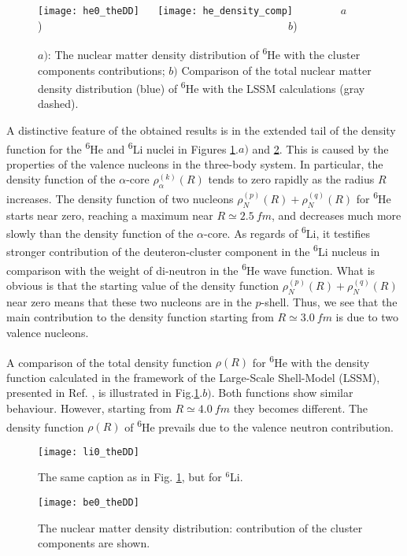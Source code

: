 \documentclass[
12pt, %
oneside, %
english, %
onehalfspacing, %
onehalfspacing, %
headsepline, %
]{MastersDoctoralThesis} %
\newcommand{\he}{\textsuperscript{6}He\xspace}
\newcommand{\li}{\textsuperscript{6}Li\xspace}
\begin{document}
\begin{figure}[bp!]
\centering
\texttt{[image: he0\_theDD]}
~~
\texttt{[image: he\_density\_comp]}
 \flushleft 
{\footnotesize ~~~~~~~~$a$)~~~~~~~~~~~~~~~~~~~~~~~~~~~~~~~~~~~~~~~~~~~~ $b$)}
\centering
\decoRule
\caption{  \footnotesize  $a)$: The nuclear matter density distribution of \he with the cluster components contributions; $b)$ Comparison of the total nuclear matter density distribution (blue) of \he with the LSSM calculations (gray dashed)\cite{antonov2005charge}.}
\label{he0_theDD}
\end{figure}


A distinctive feature of the obtained results is in the extended tail of the density function for the \he and \li nuclei in Figures \ref{he0_theDD}.$a)$ and \ref{li0_theDD}. 
This is caused by the properties of the valence nucleons in the three-body system. 
In particular, the density function of the $\alpha$-core $\rho_\alpha^{(k)}(R)$ tends to zero rapidly as the radius $R$ increases. 
The density function of two nucleons $\rho_N^{(p)}(R)+\rho_N^{(q)}(R)$ for \he starts near zero, reaching a maximum near $R \simeq 2.5~fm$, and decreases much more slowly than the density function of the $\alpha$-core.
As regards of \li, it testifies stronger contribution of the deuteron-cluster component in the \li nucleus in comparison with the weight of di-neutron in the \he wave function.
 What is obvious is that the starting value of the  density function $\rho_N^{(p)}(R)+\rho_N^{(q)}(R)$ near zero means that these two nucleons are in the $p$-shell. 
 Thus, we see that the main contribution to the density function starting from $R \simeq 3.0~fm$ is due to two valence nucleons.

A comparison of the total density function $\rho(R)$ for \he with the density function calculated in the framework of the Large-Scale Shell-Model (LSSM), presented in Ref. \cite{antonov2005charge}, is illustrated in Fig.\ref{he0_theDD}.$b)$. Both functions show similar behaviour. However, starting from $R \simeq 4.0~fm$ they becomes different. The density function $\rho(R)$ of \he prevails due to the valence neutron contribution.

\begin{figure}[tp]
\centering
\texttt{[image: li0\_theDD]}
\decoRule
\caption{  \footnotesize  The same caption as in Fig. \ref{he0_theDD}, but for $^6$Li. }
\label{li0_theDD}
\end{figure}


\begin{figure}[bp]
\centering
\texttt{[image: be0\_theDD]}
\decoRule
\caption{  \footnotesize  The nuclear matter density distribution: contribution of the cluster components are shown. }
\label{be0_theDD}
\end{figure}
\end{document}
